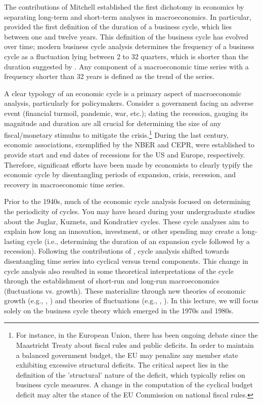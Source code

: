 \documentclass[a4paper,12pt]{article}%
\begin{document}
The contributions of Mitchell established the first dichotomy in economics by
separating long-term and short-term analyses in macroeconomics. In particular,
\cite{burns1946measuring} provided the first definition of the duration of a
business cycle, which lies between one and twelve years. This definition of
the business cycle has evolved over time; modern business cycle analysis
determines the frequency of a business cycle as a fluctuation lying between 2
to 32 quarters, which is shorter than the duration suggested by
\cite{burns1946measuring}. Any component of a macroeconomic time series with a
frequency shorter than 32 years is defined as the trend of the series.

A clear typology of an economic cycle is a primary aspect of macroeconomic
analysis, particularly for policymakers. Consider a government facing an
adverse event (financial turmoil, pandemic, war, etc.); dating the recession,
gauging its magnitude and duration are all crucial for determining the size of
any fiscal/monetary stimulus to mitigate the crisis.\footnote{For instance, in
the European Union, there has been ongoing debate since the Maastricht Treaty
about fiscal rules and public deficits. In order to maintain a balanced
government budget, the EU may penalize any member state exhibiting excessive
structural deficits. The critical aspect lies in the definition of the
'structural' nature of the deficit, which typically relies on business cycle
measures. A change in the computation of the cyclical budget deficit may
alter the stance of the EU Commission on national fiscal rules.} During the
last century, economic associations, exemplified by the NBER and CEPR, were
established to provide start and end dates of recessions for the US and
Europe, respectively. Therefore, significant efforts have been made by
economists to clearly typify the economic cycle by disentangling periods of
expansion, crisis, recession, and recovery in macroeconomic time series.

Prior to the 1940s, much of the economic cycle analysis focused on determining
the periodicity of cycles. You may have heard during your undergraduate studies
about the Juglar, Kuznets, and Kondratiev cycles. These cycle analyses aim to
explain how long an innovation, investment, or other spending may create a
long-lasting cycle (i.e., determining the duration of an expansion cycle
followed by a recession). Following the contributions of
\cite{burns1946measuring}, cycle analysis shifted towards disentangling time
series into cyclical versus trend components. This change in cycle analysis
also resulted in some theoretical interpretations of the cycle through the
establishment of short-run and long-run macroeconomics (fluctuations vs.
growth). These materialize through new theories of economic growth (e.g.,
\cite{harrod1948towards}, \cite{solow1956contribution}) and theories of
fluctuations (e.g., \cite{keynes2018general}, \cite{samuelson1948foundations}).
In this lecture, we will focus solely on the business cycle theory which
emerged in the 1970s and 1980s.
\end{document}
